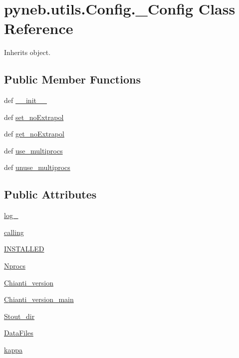 \hypertarget{classpyneb_1_1utils_1_1_config_1_1___config}{\section{pyneb.\-utils.\-Config.\-\_\-\-Config Class Reference}
\label{classpyneb_1_1utils_1_1_config_1_1___config}
}


Inherits object.

\subsection*{Public Member Functions}
\begin{DoxyCompactItemize}
\item 
def \hyperlink{classpyneb_1_1utils_1_1_config_1_1___config_ae072405b2668038f94c7751f937eb58f}{\-\_\-\-\_\-init\-\_\-\-\_\-}
\item 
def \hyperlink{classpyneb_1_1utils_1_1_config_1_1___config_adce8cac7b4d5ee4af5135c846f177b24}{set\-\_\-no\-Extrapol}
\item 
def \hyperlink{classpyneb_1_1utils_1_1_config_1_1___config_ac5edd8d3b3f8b5163f4ecba2b5d128dd}{get\-\_\-no\-Extrapol}
\item 
def \hyperlink{classpyneb_1_1utils_1_1_config_1_1___config_a16b485ab116867c682f08ab267abd4a8}{use\-\_\-multiprocs}
\item 
def \hyperlink{classpyneb_1_1utils_1_1_config_1_1___config_abc62c3412294d95af695ac59f7347326}{unuse\-\_\-multiprocs}
\end{DoxyCompactItemize}
\subsection*{Public Attributes}
\begin{DoxyCompactItemize}
\item 
\hyperlink{classpyneb_1_1utils_1_1_config_1_1___config_a8304de6467642234fcf5a7ae1e7a16bd}{log\-\_\-}
\item 
\hyperlink{classpyneb_1_1utils_1_1_config_1_1___config_abf04542e5670abea107260ca7a6baf6d}{calling}
\item 
\hyperlink{classpyneb_1_1utils_1_1_config_1_1___config_ae07a752629612175b8000d374904b22a}{I\-N\-S\-T\-A\-L\-L\-E\-D}
\item 
\hyperlink{classpyneb_1_1utils_1_1_config_1_1___config_af47651c816db6a79ea1ba34e1594e2d4}{Nprocs}
\item 
\hyperlink{classpyneb_1_1utils_1_1_config_1_1___config_aa13bf0bcb49f9e4b914399b8ddf247d9}{Chianti\-\_\-version}
\item 
\hyperlink{classpyneb_1_1utils_1_1_config_1_1___config_a13c8a6fbaf136ebfd98cc8c62d1cf05f}{Chianti\-\_\-version\-\_\-main}
\item 
\hyperlink{classpyneb_1_1utils_1_1_config_1_1___config_a3da6d1f2c9c7a10379adb0d5a48a594a}{Stout\-\_\-dir}
\item 
\hyperlink{classpyneb_1_1utils_1_1_config_1_1___config_ab6b6d2b4a7046e65edca2cf9f92be911}{Data\-Files}
\item 
\hyperlink{classpyneb_1_1utils_1_1_config_1_1___config_a753691b738e636f400f909260d23c6eb}{kappa}
\end{DoxyCompactItemize}
